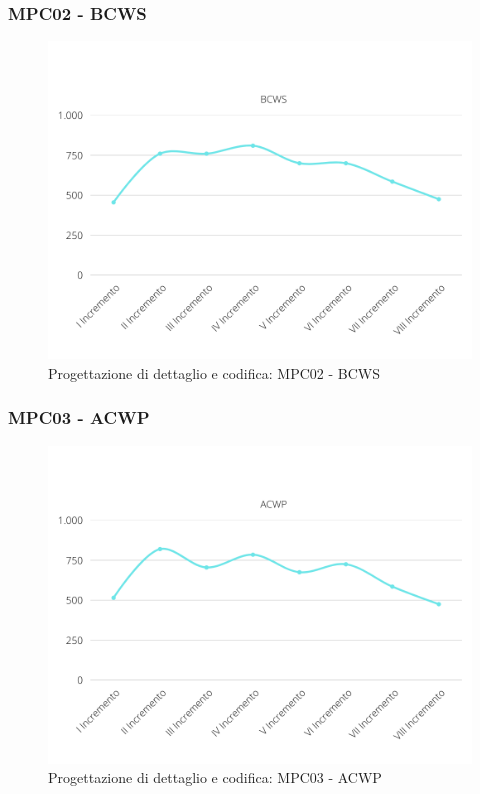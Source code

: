 \subsubsection{MPC02 - BCWS}
\begin{figure}[H]
    \centering
    \includegraphics[scale=0.50]{Sezioni/images/pdc-BCWS.png}
    \caption{Progettazione di dettaglio e codifica: MPC02 - BCWS}
\end{figure}

\subsubsection{MPC03 - ACWP}
\begin{figure}[H]
    \centering
    \includegraphics[scale=0.50]{Sezioni/images/pdc-ACWP.png}
    \caption{Progettazione di dettaglio e codifica: MPC03 - ACWP}
\end{figure}

